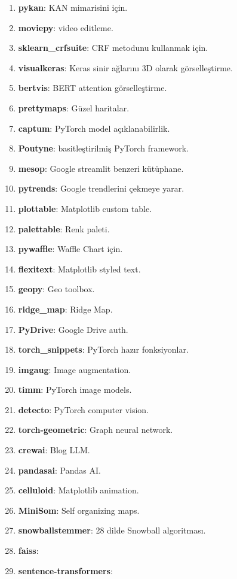\begin{enumerate}
    \item \textbf{pykan}: KAN mimarisini için.
    \item \textbf{moviepy}: video editleme.
    \item \textbf{sklearn\_crfsuite}: CRF metodunu kullanmak için.
    \item \textbf{visualkeras}: Keras sinir ağlarını 3D olarak görselleştirme.
    \item \textbf{bertvis}: BERT attention görselleştirme.
    \item \textbf{prettymaps}: Güzel haritalar.
    \item \textbf{captum}: PyTorch model açıklanabilirlik.
    \item \textbf{Poutyne}: basitleştirilmiş PyTorch framework.
    \item \textbf{mesop}: Google streamlit benzeri kütüphane.
    \item \textbf{pytrends}: Google trendlerini çekmeye yarar.
    \item \textbf{plottable}: Matplotlib custom table.
    \item \textbf{palettable}: Renk paleti.
    \item \textbf{pywaffle}: Waffle Chart için.
    \item \textbf{flexitext}: Matplotlib styled text.
    \item \textbf{geopy}: Geo toolbox.
    \item \textbf{ridge\_map}: Ridge Map.
    \item \textbf{PyDrive}: Google Drive auth.
    \item \textbf{torch\_snippets}: PyTorch hazır fonksiyonlar.
    \item \textbf{imgaug}: Image augmentation.
    \item \textbf{timm}: PyTorch image models.
    \item \textbf{detecto}: PyTorch computer vision.
    \item \textbf{torch-geometric}: Graph neural network.
    \item \textbf{crewai}: Blog LLM.
    \item \textbf{pandasai}: Pandas AI.
    \item \textbf{celluloid}: Matplotlib animation.
    \item \textbf{MiniSom}: Self organizing maps.
    \item \textbf{snowballstemmer}: 28 dilde Snowball algoritması.
    \item \textbf{faiss}:
    \item \textbf{sentence-transformers}:

\end{enumerate}

